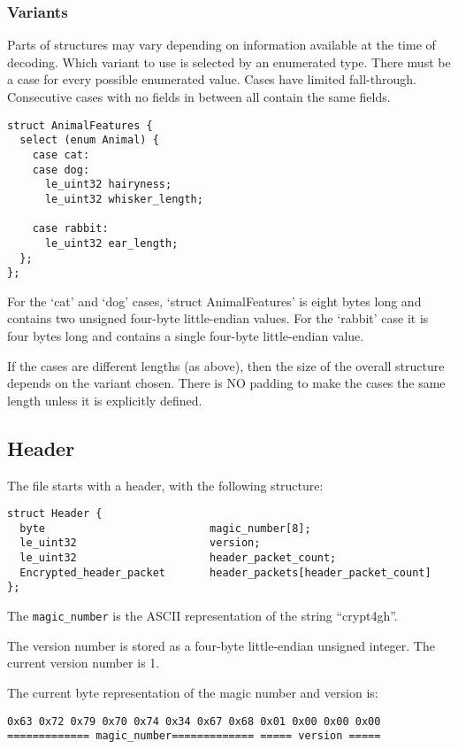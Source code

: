 \documentclass[10pt]{article}
\newcommand{\kw}[1]{\texttt{#1}}
\begin{document}
\subsubsection{Variants}
Parts of structures may vary depending on information available at the time of decoding.
Which variant to use is selected by an enumerated type.
There must be a case for every possible enumerated value.
Cases have limited fall-through.
Consecutive cases with no fields in between all contain the same fields.

\begin{verbatim}
struct AnimalFeatures {
  select (enum Animal) {
    case cat:
    case dog:
      le_uint32 hairyness;
      le_uint32 whisker_length;

    case rabbit:
      le_uint32 ear_length;
  };
};
\end{verbatim}

For the `cat' and `dog' cases, `struct AnimalFeatures' is eight bytes long and contains two unsigned four-byte
little-endian values.
For the `rabbit' case it is four bytes long and contains a single four-byte little-endian value.

If the cases are different lengths (as above), then the size of the overall structure depends on the variant chosen.
There is NO padding to make the cases the same length unless it is explicitly defined.

\subsection{Header}

The file starts with a header, with the following structure:

\begin{verbatim}
struct Header {
  byte                          magic_number[8];
  le_uint32                     version;
  le_uint32                     header_packet_count;
  Encrypted_header_packet       header_packets[header_packet_count]
};
\end{verbatim}

The \kw{magic\_number} is the ASCII representation of the string ``crypt4gh''.

The version number is stored as a four-byte little-endian unsigned integer.
The current version number is 1.

The current byte representation of the magic number and version is:
\begin{verbatim}
0x63 0x72 0x79 0x70 0x74 0x34 0x67 0x68 0x01 0x00 0x00 0x00
============= magic_number============= ===== version =====
\end{verbatim}
\end{document}
